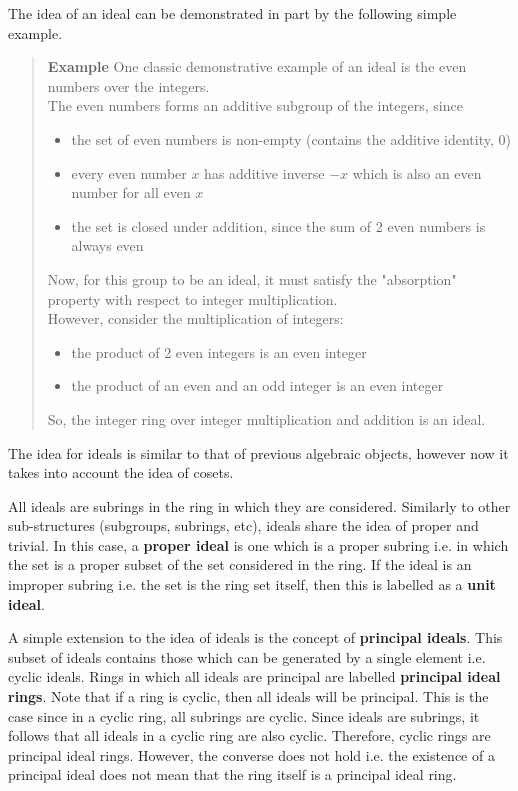 \documentclass[letterpaper,12pt,titlepage,oneside,final]{book}
\newcounter{examplecounter}
\newenvironment{example}{\begin{quote}%
    \refstepcounter{examplecounter}%
  \textbf{Example \arabic{examplecounter}}%
  \quad
}{%
\end{quote}%
}
\begin{document}
The idea of an ideal can be demonstrated in part by the following simple example.  

\begin{example}\label{ex: Simple ideal}
  One classic demonstrative example of an ideal is the even numbers over the integers.\\ 
  The even numbers forms an additive subgroup of the integers, since 
  \begin{itemize}
    \item the set of even numbers is non-empty (contains the additive identity, 0)
    \item every even number ${x}$ has additive inverse ${-x}$ which is also an even number for all even ${x}$
    \item the set is closed under addition, since the sum of 2 even numbers is always even
  \end{itemize}
  Now, for this group to be an ideal, it must satisfy the "absorption" property with respect to integer multiplication.\\
  However, consider the multiplication of integers:
  \begin{itemize}
    \item the product of 2 even integers is an even integer
    \item the product of an even and an odd integer is an even integer
  \end{itemize}
  So, the integer ring over integer multiplication and addition is an ideal.
\end{example}

The idea for ideals is similar to that of previous algebraic objects, however now it takes into account the idea of cosets.

All ideals are subrings in the ring in which they are considered.  Similarly to other sub-structures (subgroups, subrings, etc), ideals share the idea of proper and trivial.  In this case, a \textbf{proper ideal} is one which is a proper subring i.e. in which the set is a proper subset of the set considered in the ring.  If the ideal is an improper subring i.e. the set is the ring set itself, then this is labelled as a \textbf{unit ideal}.  

A simple extension to the idea of ideals is the concept of \textbf{principal ideals}.  This subset of ideals contains those which can be generated by a single element i.e. cyclic ideals.  Rings in which all ideals are principal are labelled \textbf{principal ideal rings}.  Note that if a ring is cyclic, then all ideals will be principal.  This is the case since in a cyclic ring, all subrings are cyclic.  Since ideals are subrings, it follows that all ideals in a cyclic ring are also cyclic.  Therefore, cyclic rings are principal ideal rings.  However, the converse does not hold i.e. the existence of a principal ideal does not mean that the ring itself is a principal ideal ring.  
\end{document}
